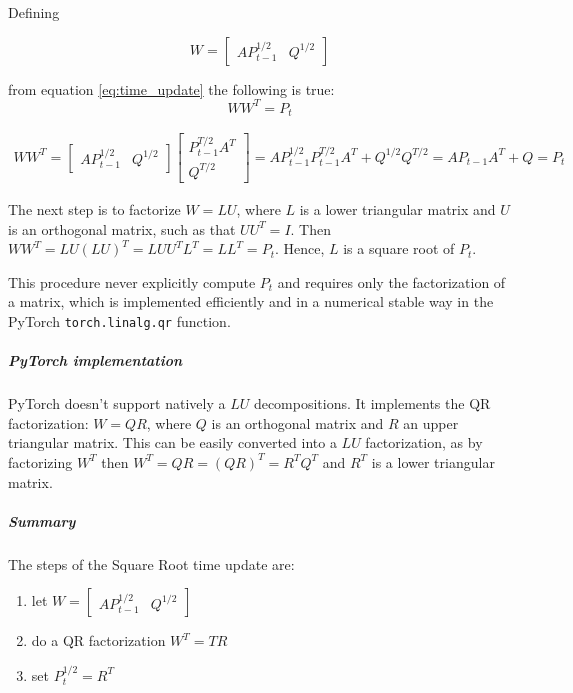 \documentclass{article}
\begin{document}
Defining

\begin{equation}
    W = \begin{bmatrix}AP_{t-1}^{1/2} & Q^{1/2}\end{bmatrix}
\end{equation}

from equation \ref{eq:time_update} the following is true:
\begin{equation}\label{time_update_SR_mult}
WW^T = P_t 
\end{equation}

\begin{multline}
  WW^T =  \begin{bmatrix}AP_{t-1}^{1/2} & Q^{1/2}\end{bmatrix}\begin{bmatrix}P_{t-1}^{T/2}A^T \\ Q^{T/2}\end{bmatrix}
  = AP_{t-1}^{1/2}P_{t-1}^{T/2}A^T + Q^{1/2}Q^{T/2} = AP_{t-1}A^T + Q = P_t
\end{multline}

The next step is to factorize  $W=LU$, where $L$ is a lower triangular matrix and $U$ is an orthogonal matrix, such as that $UU^T = I$. Then $WW^T = LU(LU)^T = LUU^TL^T = LL^T=P_t$. Hence, $L$ is a square root of $P_t$.

This procedure never explicitly compute $P_t$ and requires only the factorization of a matrix, which is implemented efficiently and in a numerical stable way in the PyTorch \verb|torch.linalg.qr| function. 

\subparagraph{PyTorch implementation} PyTorch doesn't support natively a $LU$ decompositions. It implements the QR factorization: $W=QR$, where $Q$ is an orthogonal matrix and $R$ an upper triangular matrix. This can be easily converted into a $LU$ factorization, as by factorizing $W^T$ then $W^T=QR=(QR)^T=R^TQ^T$ and $R^T$ is a lower triangular matrix.

\subparagraph{Summary} The steps of the Square Root time update are:

\begin{enumerate}
    \item let  $W = \begin{bmatrix}AP_{t-1}^{1/2} & Q^{1/2}\end{bmatrix}$
    \item do a QR factorization $W^T=TR$
    \item set $P_t^{1/2} = R^T$
\end{enumerate}
\end{document}
